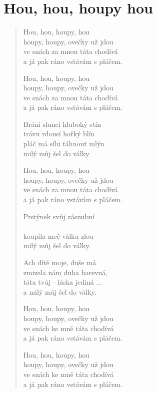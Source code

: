 \section{Hou, hou, houpy hou}

\begin{verse}
Hou, hou, houpy, hou \\
houpy, houpy, ovečky už jdou \\
ve snách za mnou táta chodívá \\
a já pak ráno vstávám s pláčem.

Hou, hou, houpy, hou \\
houpy, houpy, ovečky už jdou \\
ve snách za mnou táta chodívá \\
a já pak ráno vstávám s pláčem.

Brání slunci hluboký stín \\
trávu rdousí hořký blín \\
pláč má sílu táhnout mlýn \\
milý můj šel do války. 

Hou, hou, houpy, hou \\
houpy, houpy, ovečky už jdou \\
ve snách za mnou táta chodívá \\
a já pak ráno vstávám s pláčem.

Prstýnek svůj zásnubní  \\
  \\
koupila meč válku zlou \\ 
milý můj šel do války. 

Ach dítě moje, duše má \\
zmizela nám duha barevná, \\
táta tvůj - láska jediná ...\\
a milý můj šel do války. 

Hou, hou, houpy, hou \\
houpy, houpy, ovečky už jdou \\
ve snách ke mně táta chodívá \\
a já pak ráno vstávám s pláčem.

Hou, hou, houpy, hou \\
houpy, houpy, ovečky už jdou \\
ve snách ke mně táta chodívá \\
a já pak ráno vstávám s pláčem.


\end{verse}
